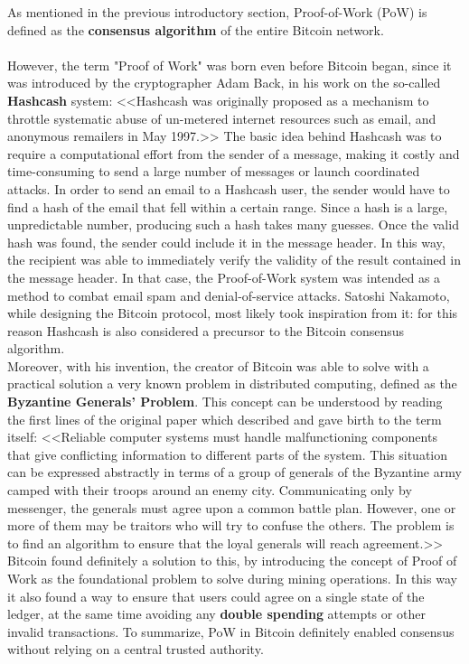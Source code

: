 As mentioned in the previous introductory section, Proof-of-Work (PoW) is defined as the \textbf{consensus algorithm} of the entire Bitcoin network.\\\\
However, the term "Proof of Work" was born even before Bitcoin began, since it was introduced by the cryptographer Adam Back, in his work on the so-called \textbf{Hashcash} system: <<Hashcash was originally proposed as a mechanism to throttle systematic abuse of un-metered internet resources such as email, and anonymous remailers in May 1997.>> \cite{back2002hashcash} The basic idea behind Hashcash was to require a computational effort from the sender of a message, making it costly and time-consuming to send a large number of messages or launch coordinated attacks. In order to send an email to a Hashcash user, the sender would have to find a hash of the email that fell within a certain range. Since a hash is a large, unpredictable number, producing such a hash takes many guesses. Once the valid hash was found, the sender could include it in the message header. In this way, the recipient was able to immediately verify the validity of the result contained in the message header. In that case, the Proof-of-Work system was intended as a method to combat email spam and denial-of-service attacks. Satoshi Nakamoto, while designing the Bitcoin protocol, most likely took inspiration from it: for this reason Hashcash is also considered a precursor to the Bitcoin consensus algorithm.\\
Moreover, with his invention, the creator of Bitcoin was able to solve with a practical solution a very known problem in distributed computing, defined as the \textbf{Byzantine Generals' Problem}. This concept can be understood by reading the first lines of the original paper which described and gave birth to the term itself: <<Reliable computer systems must handle malfunctioning components that give conflicting information to different parts of the system. This situation can be expressed abstractly in terms of a group of generals of the Byzantine army camped with their troops around an enemy city. Communicating only by messenger, the generals must agree upon a common battle plan. However, one or more of them may be traitors who will try to confuse the others. The problem is to find an algorithm to ensure that the loyal generals will reach agreement.>> \cite{journals/toplas/LamportSP82}\\
Bitcoin found definitely a solution to this, by introducing the concept of Proof of Work as the foundational problem to solve during mining operations. In this way it also found a way to ensure that users could agree on a single state of the ledger, at the same time avoiding any \textbf{double spending} attempts or other invalid transactions. To summarize, PoW in Bitcoin definitely enabled consensus without relying on a central trusted authority.\\\\
